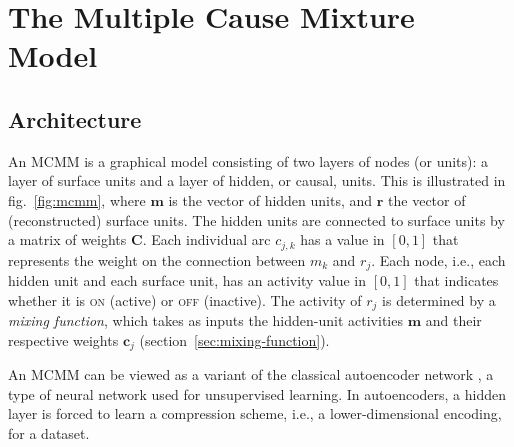 \chapter{The Multiple Cause Mixture Model}

\section{Architecture}
\label{ch4:sec:Architecture}
An MCMM is a graphical model consisting of two layers of nodes (or units): a layer of surface units 
and a layer of hidden, 
or causal, units. 
This is illustrated in fig.~\ref{fig:mcmm}, where $\mathbf{m}$ is the vector of hidden units, and $\mathbf{r}$ the vector of (reconstructed) surface units.
The hidden units are connected to surface units by a matrix of weights $\mathbf{C}$. 
Each individual arc $c_{j,k}$ has a value in $[0,1]$ that represents the weight on the connection between
$m_k$ and $r_j$.
Each node, i.e., each hidden unit and each surface unit, has an activity value in $[0,1]$ that
indicates whether it is \textsc{on} (active) or \textsc{off} (inactive).
The activity of $r_j$ is determined by a \emph{mixing function}, which takes as inputs the hidden-unit activities $\mathbf{m}$ and their respective weights $\mathbf{c}_j$
(section~\ref{sec:mixing-function}).




An MCMM can be viewed as a variant of the classical autoencoder
network \citep{dayan-and-zemel:95}, a type of neural network used for
unsupervised learning.  In autoencoders, a hidden layer is forced to
learn a compression scheme, i.e., a lower-dimensional encoding, for
a dataset.
 

